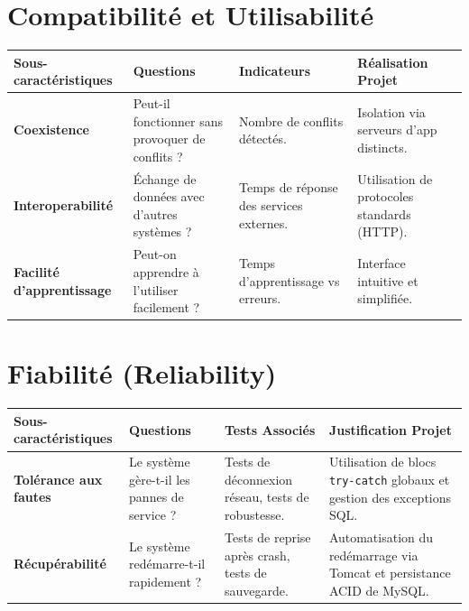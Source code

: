 \documentclass[12pt,a4paper]{report}
\begin{document}
\section{Compatibilité et Utilisabilité}
\begin{table}[ht!]
\centering\small
\begin{tabular}{|p{3.5cm}|p{3cm}|p{3.5cm}|p{4cm}|}
\hline
\rowcolor{headerblue}\color{white}Sous-caractéristiques & \color{white}Questions & \color{white}Indicateurs & \color{white}Réalisation Projet \\ \hline
\textbf{Coexistence} & Peut-il fonctionner sans provoquer de conflits ? & Nombre de conflits détectés. & Isolation via serveurs d'app distincts. \\ \hline
\textbf{Interoperabilité} & Échange de données avec d'autres systèmes ? & Temps de réponse des services externes. & Utilisation de protocoles standards (HTTP). \\ \hline
\textbf{Facilité d'apprentissage} & Peut-on apprendre à l'utiliser facilement ? & Temps d'apprentissage vs erreurs. & Interface intuitive et simplifiée. \\ \hline
\end{tabular}
\end{table}

\section{Fiabilité (Reliability)}
\begin{table}[ht!]
\centering\small
\begin{tabular}{|p{3cm}|p{3cm}|p{4cm}|p{4cm}|}
\hline
\rowcolor{headerblue}\color{white}Sous-caractéristiques & \color{white}Questions & \color{white}Tests Associés & \color{white}Justification Projet \\ \hline
\textbf{Tolérance aux fautes} & Le système gère-t-il les pannes de service ? & Tests de déconnexion réseau, tests de robustesse. & Utilisation de blocs \texttt{try-catch} globaux et gestion des exceptions SQL. \\ \hline
\textbf{Récupérabilité} & Le système redémarre-t-il rapidement ? & Tests de reprise après crash, tests de sauvegarde. & Automatisation du redémarrage via Tomcat et persistance ACID de MySQL. \\ \hline
\end{tabular}
\end{table}
\end{document}
